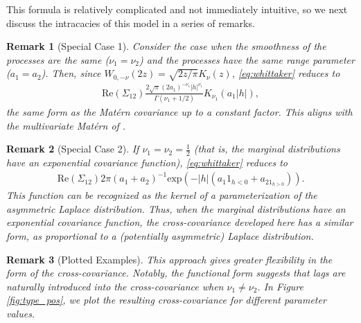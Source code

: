 \documentclass[11pt]{article}
\newtheorem*{remark}{Remark}
\begin{document}
This formula is relatively complicated and not immediately intuitive, so we next discuss the intracacies of this model in a series of remarks.

\begin{remark}[Special Case 1]
 \normalfont
Consider the case when the smoothness of the processes are the same ($\nu_1 = \nu_2$) and the processes have the same range parameter ($a_1 = a_2$). Then, since $W_{0, -\nu}(2z) = \sqrt{2z/\pi} K_\nu(z)$, \eqref{eq:whittaker} reduces to \begin{align*}
\textrm{Re}(\Sigma_{12})\frac{2\sqrt{\pi} (2a_1)^{ -\nu_1}|h|^{\nu_1}}{\Gamma(\nu_1+1/2)}K_{\nu_1}(a_1|h|),\end{align*}the same form as the Mat\'ern covariance up to a constant factor. This aligns with the multivariate Mat\'ern of \cite{gneiting_matern_2010}.

\end{remark}

\begin{remark}[Special Case 2]
 \normalfont
If $\nu_1 = \nu_2 = \frac{1}{2}$ (that is, the marginal distributions have an exponential covariance function), \eqref{eq:whittaker} reduces to \begin{align*}
\textrm{Re}(\Sigma_{12})2\pi(a_1 + a_2)^{-1}\textrm{exp}\left(-|h|(a_1 1_{h < 0} +a_21_{h>0})\right).\end{align*}This function can be recognized as the kernel of a parameterization of the asymmetric Laplace distribution. Thus, when the marginal distributions have an exponential covariance function, the cross-covariance developed here has a similar form, as proportional to a (potentially asymmetric) Laplace distribution. 

\end{remark}


\begin{remark}[Plotted Examples] \normalfont
This approach gives greater flexibility in the form of the cross-covariance. Notably, the functional form suggests that lags are naturally introduced into the cross-covariance when $\nu_1\neq \nu_2$. In Figure \ref{fig:type_pos}, we plot the resulting cross-covariance for different parameter values.  
\end{remark}
\end{document}

